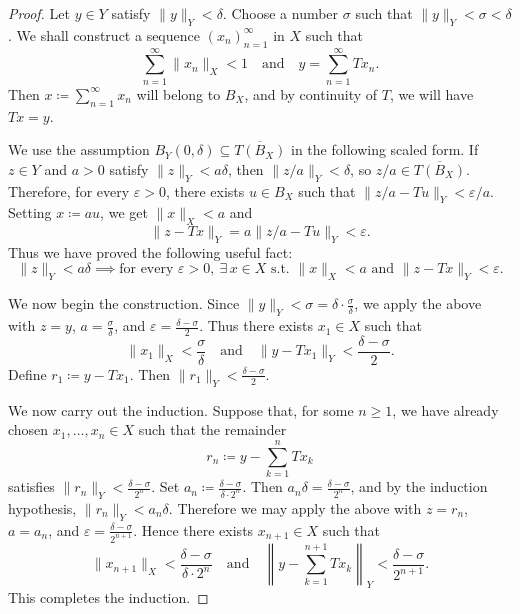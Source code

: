 \begin{proof}
    Let \(y \in Y\) satisfy \(\lVert y \rVert_Y < \delta\). Choose a number \(\sigma\) such that \(\lVert y \rVert_Y < \sigma < \delta\). We shall construct a sequence \((x_n)_{n=1}^{\infty}\) in \(X\) such that
    \[
        \sum_{n=1}^{\infty} \lVert x_n \rVert_X < 1 \quad \text{and} \quad y = \sum_{n=1}^{\infty} T x_n.
    \]
    Then \(x \coloneqq \sum_{n=1}^{\infty} x_n\) will belong to \(B_X\), and by continuity of \(T\), we will have \(Tx = y\).

    We use the assumption \(B_Y(0, \delta) \subseteq \overline{T(B_X)}\) in the following scaled form. If \(z \in Y\) and \(a > 0\) satisfy \(\lVert z \rVert_Y < a\delta\), then \(\lVert z/a \rVert_Y < \delta\), so \(z/a \in \overline{T(B_X)}\). Therefore, for every \(\varepsilon > 0\), there exists \(u \in B_X\) such that \(\lVert z/a - Tu \rVert_Y < \varepsilon/a\). Setting \(x \coloneqq au\), we get \(\lVert x \rVert_X < a\) and
    \[
        \lVert z - Tx \rVert_Y = a\lVert z/a - Tu \rVert_Y < \varepsilon.
    \]
    Thus we have proved the following useful fact:
    \[
        \lVert z \rVert_Y < a\delta \implies \text{for every } \varepsilon > 0,\ \exists\, x \in X \text{ s.t. } \lVert x \rVert_X < a \text{ and } \lVert z - Tx \rVert_Y < \varepsilon.
    \]

    We now begin the construction. Since \(\lVert y \rVert_Y < \sigma = \delta \cdot \frac{\sigma}{\delta}\), we apply the above with \(z = y\), \(a = \frac{\sigma}{\delta}\), and \(\varepsilon = \frac{\delta - \sigma}{2}\). Thus there exists \(x_1 \in X\) such that
    \[
        \lVert x_1 \rVert_X < \frac{\sigma}{\delta} \quad \text{and} \quad \lVert y - T x_1 \rVert_Y < \frac{\delta - \sigma}{2}.
    \]
    Define \(r_1 \coloneqq y - T x_1\). Then \(\lVert r_1 \rVert_Y < \frac{\delta - \sigma}{2}\).

    We now carry out the induction. Suppose that, for some \(n \geq 1\), we have already chosen \(x_1, \ldots, x_n \in X\) such that the remainder
    \[
        r_n \coloneqq y - \sum_{k=1}^n T x_k
    \]
    satisfies \(\lVert r_n \rVert_Y < \frac{\delta - \sigma}{2^n}\). Set \(a_n \coloneqq \frac{\delta - \sigma}{\delta \cdot 2^n}\). Then \(a_n \delta = \frac{\delta - \sigma}{2^n}\), and by the induction hypothesis, \(\lVert r_n \rVert_Y < a_n \delta\). Therefore we may apply the above with \(z = r_n\), \(a = a_n\), and \(\varepsilon = \frac{\delta - \sigma}{2^{n+1}}\). Hence there exists \(x_{n+1} \in X\) such that
    \[
        \lVert x_{n+1} \rVert_X < \frac{\delta - \sigma}{\delta \cdot 2^n} \quad \text{and} \quad \left\lVert y - \sum_{k=1}^{n+1} T x_k \right\rVert_Y < \frac{\delta - \sigma}{2^{n+1}}.
    \]
    This completes the induction.


\end{proof}
